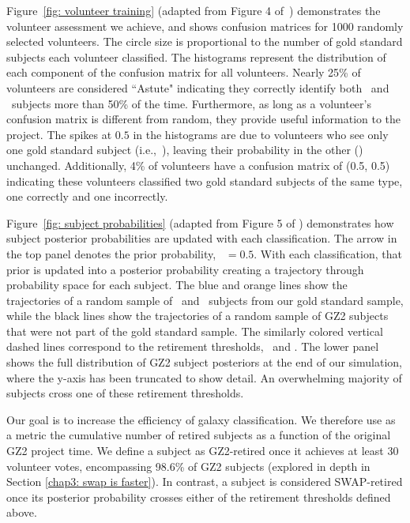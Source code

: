 Figure~\ref{fig: volunteer training} (adapted from Figure 4 of~\citealt{Marshall2016}) demonstrates the volunteer assessment we achieve, and shows confusion matrices for 1000 randomly selected volunteers. The circle size is proportional to the number of gold standard subjects each volunteer classified. The histograms represent the distribution of each component of the confusion matrix for all volunteers. Nearly 25\% of volunteers are considered ``Astute"  indicating they correctly identify both \feat~and \notfeat~subjects more than 50\% of the time. Furthermore, as long as a volunteer's confusion matrix is different from random, they provide useful information to the project. The spikes at $0.5$ in the histograms are due to volunteers who see only one gold standard subject (i.e.,~\feat), leaving their probability in the other (\notfeat) unchanged. Additionally, 4\% of volunteers have a confusion matrix of (0.5, 0.5) indicating these volunteers classified two gold standard subjects of the same type, one correctly and one incorrectly. 

Figure~\ref{fig: subject probabilities} (adapted from Figure 5 of \citealt{Marshall2016}) demonstrates how subject posterior probabilities are updated with each classification. The arrow in the top panel denotes the prior probability, \p~$=0.5$. With each classification, that prior is updated into a posterior probability creating a trajectory through probability space for each subject. The blue and orange lines show the trajectories of a random sample of \feat~and \notfeat~subjects from our gold standard sample, while the black lines show the trajectories of a random sample of GZ2 subjects that were not part of the gold standard  sample. The similarly colored vertical dashed lines correspond to the retirement thresholds, \tf~and \tn. The lower panel shows the full distribution of GZ2 subject posteriors at the end of our simulation, where the y-axis has been truncated to show detail. An overwhelming majority of subjects cross one of these retirement thresholds.

Our goal is to increase the efficiency of galaxy classification. We therefore  use as a metric the cumulative number of retired subjects as a function of the original GZ2 project time. We define a subject as GZ2-retired once it achieves at least 30 volunteer votes, encompassing 98.6\% of GZ2 subjects (explored in depth in Section \ref{chap3: swap is faster}).  In contrast, a subject is considered SWAP-retired once its posterior probability crosses either of the retirement thresholds defined above. 

